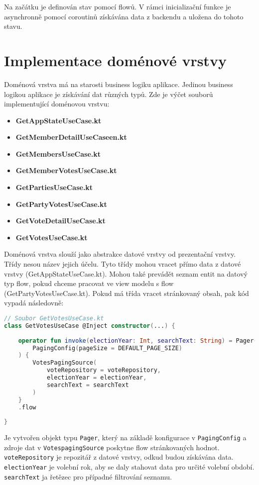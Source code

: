 \noindent Na začátku je definován stav pomocí flowů. V rámci inicializační funkce je asynchronně pomocí coroutinů získávána data z backendu a uložena do tohoto stavu. 

\section {Implementace doménové vrstvy}
Doménová vrstva má na starosti business logiku aplikace. Jedinou business logikou aplikace je získávání dat různých typů. Zde je výčet souborů implementující doménovou vrstvu:

\begin{itemize}
	\item \textbf{GetAppStateUseCase.kt}
	\item \textbf{GetMemberDetailUseCaseen.kt}
	\item \textbf{GetMembersUseCase.kt}
	\item \textbf{GetMemberVotesUseCase.kt}
	\item \textbf{GetPartiesUseCase.kt}
	\item \textbf{GetPartyVotesUseCase.kt}
	\item \textbf{GetVoteDetailUseCase.kt}
	\item \textbf{GetVotesUseCase.kt}
\end{itemize}

\noindent Doménová vrstva slouží jako abstrakce datové vrstvy od prezentační vrstvy. Třídy nesou název jejich účelu. Tyto třídy mohou vracet přímo data z datové vrstvy (GetAppStateUseCase.kt). Mohou také prevádět seznam entit na datový typ flow, pokud chceme pracovat ve view modelu s flow (GetPartyVotesUseCase.kt). Pokud má třída vracet stránkovaný obsah, pak kód vypadá následovně:

\begin{lstlisting}[caption={Ukázka využití třídy doménové vrstvy pro získání stránkovaného seznamu hlasování}, label={lst:use-case-vote}, tabsize=2, language=Kotlin]
// Soubor GetVotesUseCase.kt
class GetVotesUseCase @Inject constructor(...) {
	
	operator fun invoke(electionYear: Int, searchText: String) = Pager(
		PagingConfig(pageSize = DEFAULT_PAGE_SIZE)
	) {
		VotesPagingSource(
			voteRepository = voteRepository,
			electionYear = electionYear,
			searchText = searchText
		)
	}
	.flow
	
}
\end{lstlisting}

\noindent Je vytvořen objekt typu \lstinline|Pager|, který na základě konfigurace v \lstinline|PagingConfig| a zdroje dat \linebreak v \lstinline|VotespagingSource| poskytne flow stránkovaných hodnot.  \lstinline|voteRepository| je repozitář z datové vrstvy, odkud budou získávána data. \lstinline|electionYear| je volební rok, aby se daly stahovat data pro určité volební období. \lstinline|searchText| ja řetězec pro případné filtrování seznamu.

